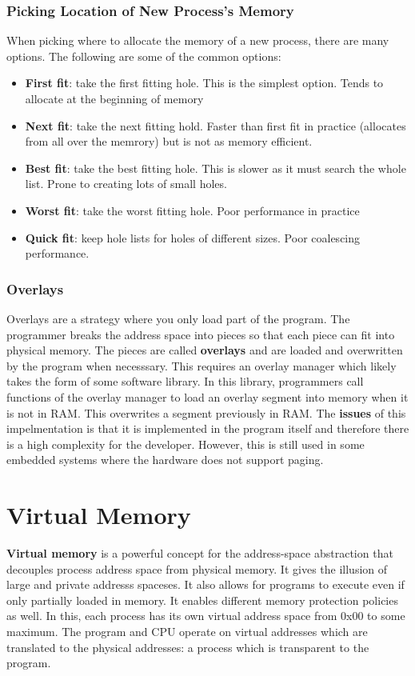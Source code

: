 \documentclass{article}
\newcommand{\bold}[1]{\textbf{#1}}
\renewcommand{\b}{\item[$\circ$]}
\newcommand{\newlist}{\begin{itemize}}
\renewcommand{\endlist}{\end{itemize}}
\begin{document}
\subsubsection{Picking Location of New Process's Memory}

When picking where to allocate the memory of a new process, there are many options. The following are some of the common options:

\newlist
\b \bold{First fit}: take the first fitting hole. This is the simplest option. Tends to allocate at the beginning of memory
\b \bold{Next fit}: take the next fitting hold. Faster than first fit in practice (allocates from all over the memrory) but is not as memory efficient.
\b \bold{Best fit}: take the best fitting hole. This is slower as it must search the whole list. Prone to creating lots of small holes. 
\b \bold{Worst fit}: take the worst fitting hole. Poor performance in practice
\b \bold{Quick fit}: keep hole lists for holes of different sizes. Poor coalescing performance.
\endlist

\subsubsection{Overlays}

Overlays are a strategy where you only load part of the program. The programmer breaks the address space into pieces so that each piece can fit into physical memory. The pieces are called \bold{overlays} and are loaded and overwritten by the program when necesssary. This requires an overlay manager which likely takes the form of some software library. In this library, programmers call functions of the overlay manager to load an overlay segment into memory when it is not in RAM. This overwrites a segment previously in RAM. The \bold{issues} of this impelmentation is that it is implemented in the program itself and therefore there is a high complexity for the developer. However, this is still used in some embedded systems where the hardware does not support paging. 

\section{Virtual Memory}

\bold{Virtual memory} is a powerful concept for the address-space abstraction that decouples process address space from physical memory. It gives the illusion of large and private addresss spaceses. It also allows for programs to execute even if only partially loaded in memory. It enables different memory protection policies as well. In this, each process has its own virtual address space from 0x00 to some maximum. The program and CPU operate on virtual addresses which are translated to the physical addresses: a process which is transparent to the program. \\ 
\end{document}

